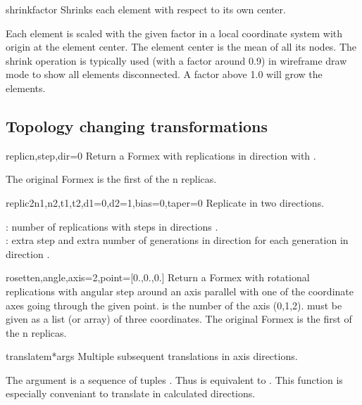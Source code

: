 \begin{methoddesc}{shrink}{factor}
Shrinks each element with respect to its own center.

Each element is scaled with the given factor in a local coordinate
system with origin at the element center. The element center is the
mean of all its nodes.
The shrink operation is typically used (with a factor around 0.9) in
wireframe draw mode to show all elements disconnected. A factor above
1.0 will grow the elements.
\end{methoddesc}


\subsection{Topology changing transformations}

\begin{methoddesc}{replic}{n,step,dir=0}
Return a Formex with  replications in direction  with .

The original Formex is the first of the n replicas.
\end{methoddesc}

\begin{methoddesc}{replic2}{n1,n2,t1,t2,d1=0,d2=1,bias=0,taper=0}
Replicate in two directions.

 : number of replications with steps  in directions .\\
 : extra step and extra number of generations in direction  for each generation in direction .
\end{methoddesc}

\begin{methoddesc}{rosette}{n,angle,axis=2,point=[0.,0.,0.]}
Return a Formex with  rotational replications with angular step  around an axis parallel with one of the coordinate axes going through the given point.  is the number of the axis (0,1,2).  must be given as a list (or array) of three coordinates. The original Formex is the first of the n replicas.
\end{methoddesc}

\begin{methoddesc}{translatem}{*args}
Multiple subsequent translations in axis directions.

The argument  is a sequence of tuples . Thus  is equivalent to . This function is especially conveniant to translate in calculated directions.
\end{methoddesc}


